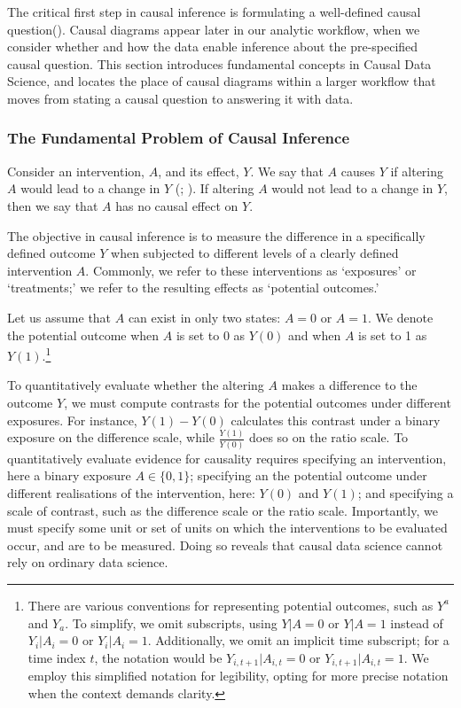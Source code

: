 \documentclass[
  singlecolumn,
  9pt]{article}
\begin{document}
The critical first step in causal inference is formulating a
well-defined causal question(). Causal diagrams appear later in our analytic
workflow, when we consider whether and how the data enable inference
about the pre-specified causal question. This section introduces
fundamental concepts in Causal Data Science, and locates the place of
causal diagrams within a larger workflow that moves from stating a
causal question to answering it with data.

\subsubsection{The Fundamental Problem of Causal
Inference}\label{the-fundamental-problem-of-causal-inference}

Consider an intervention, \(A\), and its effect, \(Y\). We say that
\(A\) causes \(Y\) if altering \(A\) would lead to a change in \(Y\)
(; ). If altering \(A\) would not lead to a change in \(Y\), then we
say that \(A\) has no causal effect on \(Y\).

The objective in causal inference is to measure the difference in a
specifically defined outcome \(Y\) when subjected to different levels of
a clearly defined intervention \(A\). Commonly, we refer to these
interventions as `exposures' or `treatments;' we refer to the resulting
effects as `potential outcomes.'

Let us assume that \(A\) can exist in only two states: \(A = 0\) or
\(A = 1\). We denote the potential outcome when \(A\) is set to 0 as
\(Y(0)\) and when \(A\) is set to 1 as \(Y(1)\).\footnote{There are
  various conventions for representing potential outcomes, such as
  \(Y^a\) and \(Y_a\). To simplify, we omit subscripts, using
  \(Y|A = 0\) or \(Y|A = 1\) instead of \(Y_i|A_i = 0\) or
  \(Y_i|A_i = 1\). Additionally, we omit an implicit time subscript; for
  a time index \(t\), the notation would be \(Y_{i,t+1}|A_{i,t} = 0\) or
  \(Y_{i,t+1}|A_{i,t} = 1\). We employ this simplified notation for
  legibility, opting for more precise notation when the context demands
  clarity.}

To quantitatively evaluate whether the altering \(A\) makes a difference
to the outcome \(Y\), we must compute contrasts for the potential
outcomes under different exposures. For instance, \(Y(1) - Y(0)\)
calculates this contrast under a binary exposure on the difference
scale, while \(\frac{Y(1)}{Y(0)}\) does so on the ratio scale. To
quantitatively evaluate evidence for causality requires specifying an
intervention, here a binary exposure \(A \in \{0,1\}\); specifying an
the potential outcome under different realisations of the intervention,
here: \(Y(0)\) and \(Y(1)\); and specifying a scale of contrast, such as
the difference scale or the ratio scale. Importantly, we must specify
some unit or set of units on which the interventions to be evaluated
occur, and are to be measured. Doing so reveals that causal data science
cannot rely on ordinary data science.
\end{document}
